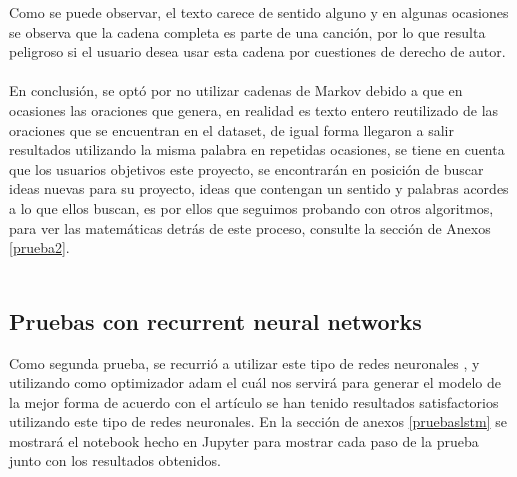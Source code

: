 \documentclass[12pt, a4paper, titlepage]{report}
\begin{document}
   		Como se puede observar, el texto carece de sentido alguno y en algunas ocasiones se observa que la cadena completa es parte de una canción, por lo que resulta peligroso si el usuario desea usar esta cadena por cuestiones de derecho de autor.\\\\
	   	En conclusión, se optó por no utilizar cadenas de Markov debido a que en ocasiones las oraciones que genera, en realidad es texto entero reutilizado de las oraciones que se encuentran en el dataset, de igual forma llegaron a salir resultados utilizando la misma palabra en repetidas ocasiones, se tiene en cuenta que los usuarios objetivos este proyecto, se encontrarán en posición de buscar ideas nuevas para su proyecto, ideas que contengan un sentido y palabras acordes a lo que ellos buscan, es por ellos que seguimos probando con otros algoritmos, para ver las matemáticas detrás de este proceso, consulte la sección de Anexos \ref{prueba2}.\\\\
	   	
	   	\subsection{Pruebas con recurrent neural networks}
	   	Como segunda prueba, se recurrió a utilizar este tipo de redes neuronales \cite{PruebaLSTM}, y utilizando como optimizador adam\cite{adam} el cuál nos servirá para generar el modelo de la mejor forma de acuerdo con el artículo \cite{adam2}se han tenido resultados satisfactorios utilizando este tipo de redes neuronales. En la sección de anexos \ref{pruebaslstm} se mostrará el notebook hecho en Jupyter para mostrar cada paso de la prueba junto con los resultados obtenidos.
	   	\newpage
\end{document}
